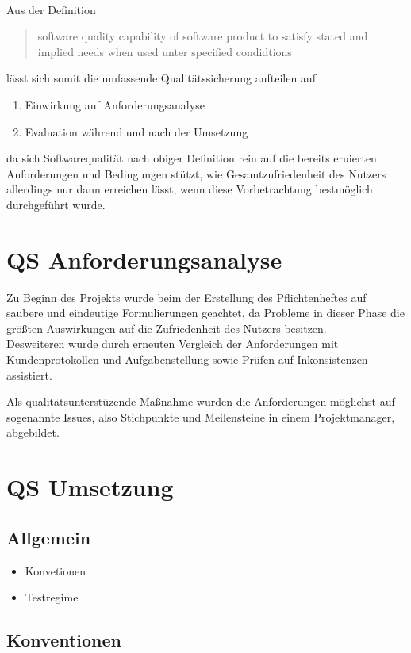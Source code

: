 \paragraph*{}Aus der Definition
\begin{quote}\label{PD_SQ}
software quality
capability of software product to satisfy stated and implied needs when used unter specified condidtions
\end{quote}\cite[4 Terms and definitions]{ISO25000}
lässt sich somit die umfassende Qualitätssicherung aufteilen auf
\begin{enumerate}
\item Einwirkung auf Anforderungsanalyse
\item Evaluation während und nach der Umsetzung
\end{enumerate}
da sich Softwarequalität nach obiger Definition rein auf die bereits eruierten Anforderungen und Bedingungen stützt, wie Gesamtzufriedenheit des Nutzers allerdings nur dann erreichen lässt, wenn diese Vorbetrachtung bestmöglich durchgeführt wurde.
\section{QS Anforderungsanalyse}
Zu Beginn des Projekts wurde beim der Erstellung des Pflichtenheftes auf saubere und eindeutige Formulierungen geachtet, da Probleme in dieser Phase die größten Auswirkungen auf die Zufriedenheit des Nutzers besitzen.\\
Desweiteren wurde durch erneuten Vergleich der Anforderungen mit Kundenprotokollen und Aufgabenstellung sowie Prüfen auf Inkonsistenzen assistiert.

Als qualitätsunterstüzende Maßnahme wurden die Anforderungen möglichst auf sogenannte Issues, also Stichpunkte und Meilensteine in einem Projektmanager, abgebildet.
\section{QS Umsetzung}
\subsection{Allgemein}
\begin{itemize}
\item Konvetionen
\item Testregime
\end{itemize}
\subsection{Konventionen}
